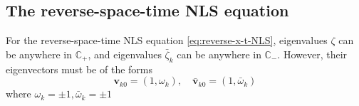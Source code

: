 \subsection{The reverse-space-time NLS equation}
\begin{theorem}\label{thm:NLS-inverse-x-t}
    For the reverse-space-time NLS equation \eqref{eq:reverse-x-t-NLS}, eigenvalues $ \zeta $ can be anywhere in $ \mathbb{C}_{+} $, and eigenvalues $ \bar{\zeta}_{k} $ can be anywhere in $ \mathbb{C}_{-} $. However, their eigenvectors must be of the forms
    \begin{equation}
        \mathbf{v}_{k0} = (1, \omega_{k}), \quad \bar{\mathbf{v}}_{k0} = (1, \bar{\omega}_{k})
    \end{equation}
    where $ \omega_{k} = \pm 1, \bar{\omega}_{k} = \pm 1 $
\end{theorem}
